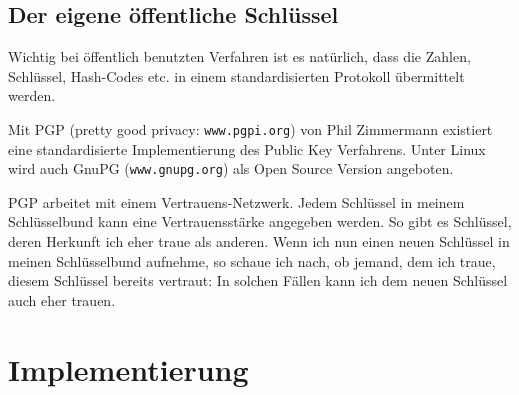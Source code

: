 \subsection{Der eigene öffentliche Schlüssel}

Wichtig bei öffentlich benutzten Verfahren ist es natürlich, dass die
Zahlen, Schlüssel, Hash-Codes etc. in einem standardisierten Protokoll
übermittelt werden.

Mit PGP (pretty good privacy: \texttt{www.pgpi.org}) von
Phil Zimmermann existiert eine standardisierte Implementierung des
Public Key Verfahrens. Unter Linux wird auch GnuPG (\texttt{www.gnupg.org}) als Open
Source Version angeboten.

PGP arbeitet mit einem Vertrauens-Netzwerk. Jedem Schlüssel in meinem
Schlüsselbund kann eine Vertrauensstärke angegeben werden. So gibt es
Schlüssel, deren Herkunft ich eher traue als anderen. Wenn ich nun
einen neuen Schlüssel in meinen Schlüsselbund aufnehme, so schaue ich
nach, ob jemand, dem ich traue, diesem Schlüssel bereits vertraut: In
solchen Fällen kann ich dem neuen Schlüssel auch eher trauen.


%

\section{Implementierung}
\label{sec:implementierung}

